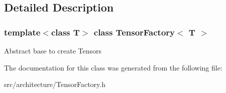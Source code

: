 \subsection{Detailed Description}
\subsubsection*{template$<$class T$>$\newline
class Tensor\+Factory$<$ T $>$}

Abstract base to create Tensors 

The documentation for this class was generated from the following file\+:\begin{DoxyCompactItemize}
\item 
src/architecture/Tensor\+Factory.\+h\end{DoxyCompactItemize}
